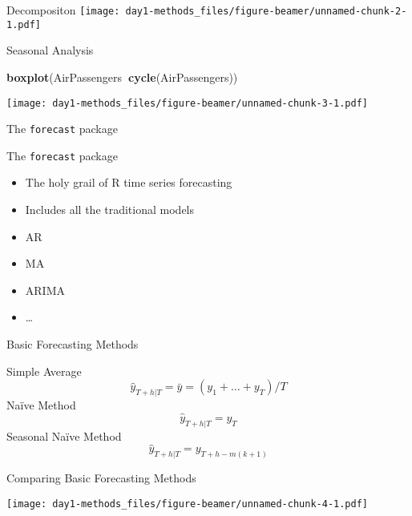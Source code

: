 \documentclass[ignorenonframetext,]{beamer}
\newenvironment{Shaded}{\begin{snugshade}}{\end{snugshade}}
\newcommand{\KeywordTok}[1]{\textcolor[rgb]{0.13,0.29,0.53}{\textbf{#1}}}
\newcommand{\OperatorTok}[1]{\textcolor[rgb]{0.81,0.36,0.00}{\textbf{#1}}}
\newcommand{\NormalTok}[1]{#1}
\providecommand{\tightlist}{%
  \setlength{\itemsep}{0pt}\setlength{\parskip}{0pt}}
\begin{document}
\begin{frame}[fragile]
\begin{block}{Decompositon}
\texttt{[image: day1-methods\_files/figure-beamer/unnamed-chunk-2-1.pdf]}

\end{block}

\begin{block}{Seasonal Analysis}

\begin{Shaded}
\begin{Highlighting}[]
\KeywordTok{boxplot}\NormalTok{(AirPassengers}\OperatorTok{~}\KeywordTok{cycle}\NormalTok{(AirPassengers))}
\end{Highlighting}
\end{Shaded}

\texttt{[image: day1-methods\_files/figure-beamer/unnamed-chunk-3-1.pdf]}

\end{block}

\end{frame}

\begin{frame}[fragile]{The \texttt{forecast} package}

\begin{block}{The \texttt{forecast} package}

\begin{itemize}
\tightlist
\item
  The holy grail of R time series forecasting
\item
  Includes all the traditional models
\item
  AR
\item
  MA
\item
  ARIMA
\item
  \ldots{}
\end{itemize}

\end{block}

\begin{block}{Basic Forecasting Methods}

Simple Average \[\hat{y}_{T+h|T} = \bar{y} = (y_{1}+\dots+y_{T})/T\]
Naïve Method \[\hat{y}_{T+h|T} = y_{T}\] Seasonal Naïve Method
\[\hat{y}_{T+h|T} = y_{T+h-m(k+1)}\]

\end{block}

\begin{block}{Comparing Basic Forecasting Methods}

\texttt{[image: day1-methods\_files/figure-beamer/unnamed-chunk-4-1.pdf]}

\end{block}

\end{frame}
\end{document}
